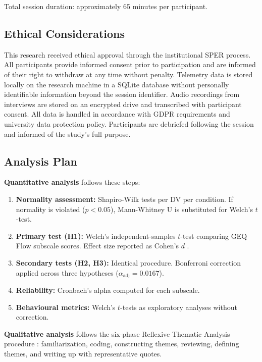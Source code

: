 \documentclass[12pt,a4paper]{report}
\begin{document}
Total session duration: approximately 65 minutes per participant.

\subsection{Ethical Considerations}

This research received ethical approval through the institutional SPER process. All participants provide informed consent prior to participation and are informed of their right to withdraw at any time without penalty. Telemetry data is stored locally on the research machine in a SQLite database without personally identifiable information beyond the session identifier. Audio recordings from interviews are stored on an encrypted drive and transcribed with participant consent. All data is handled in accordance with GDPR requirements and university data protection policy. Participants are debriefed following the session and informed of the study's full purpose.

\subsection{Analysis Plan}

\textbf{Quantitative analysis} follows these steps:

\begin{enumerate}
\item \textbf{Normality assessment:} Shapiro-Wilk tests per DV per condition. If normality is violated ($p < 0.05$), Mann-Whitney U is substituted for Welch's $t$-test.
\item \textbf{Primary test (H1):} Welch's independent-samples $t$-test comparing GEQ Flow subscale scores. Effect size reported as Cohen's $d$ \citep{cohen1988statistical}.
\item \textbf{Secondary tests (H2, H3):} Identical procedure. Bonferroni correction applied across three hypotheses ($\alpha_{\text{adj}} = 0.0167$).
\item \textbf{Reliability:} Cronbach's alpha computed for each subscale.
\item \textbf{Behavioural metrics:} Welch's $t$-tests as exploratory analyses without correction.
\end{enumerate}

\textbf{Qualitative analysis} follows the six-phase Reflexive Thematic Analysis procedure \citep{braun2022thematic}: familiarization, coding, constructing themes, reviewing, defining themes, and writing up with representative quotes.
\end{document}

